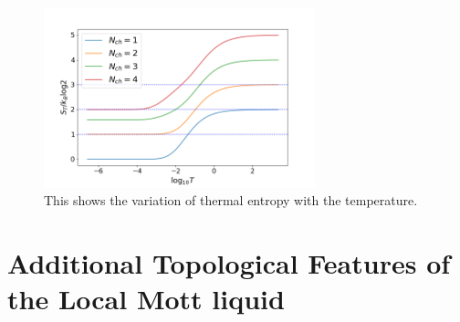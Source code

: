 \documentclass[reprint,onecolumn,prb,superscriptaddress]{revtex4-2}
\begin{document}
\begin{figure}
\centering
\includegraphics[width=0.7\textwidth]{plt/ThermalEntanglementVSLogTemperature}
\caption{This shows the variation of thermal entropy with the temperature.}
\label{fig:thermal_entropy}
\end{figure}

\section{Additional Topological Features of the Local Mott liquid}
\end{document}
